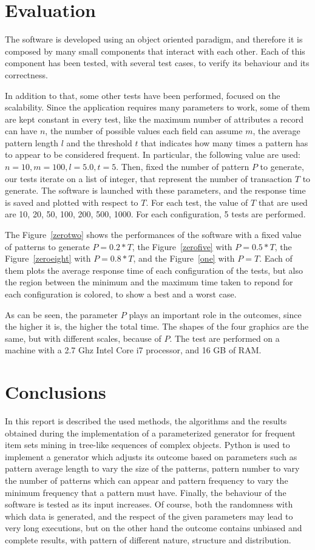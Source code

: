 \documentclass{acm_proc_article-sp-sigmod09}
\begin{document}
\section{Evaluation}
The software is developed using an object oriented paradigm, and therefore it is composed by many small components that interact with each other. Each of this component has been tested, with several test cases, to verify its behaviour and its correctness.

In addition to that, some other tests have been performed, focused on the scalability. Since the application requires many parameters to work, some of them are kept constant in every test, like the maximum number of attributes a record can have $n$, the number of possible values each field can assume $m$, the average pattern length $l$ and the threshold $t$ that indicates how many times a pattern has to appear to be considered frequent. In particular, the following value are used: $n = 10, m = 100, l = 5.0, t = 5$. Then, fixed the number of pattern $P$ to generate, our tests iterate on a list of integer, that represent the number of transaction $T$ to generate. The software is launched with these parameters, and the response time is saved and plotted with respect to $T$. For each test, the value of $T$ that are used are 10, 20, 50, 100, 200, 500, 1000. For each configuration, 5 tests are performed.

The Figure~\ref{zerotwo} shows the performances of the software with a fixed value of patterns to generate $P = 0.2 * T$, the Figure~\ref{zerofive} with $P = 0.5 * T$, the Figure~\ref{zeroeight} with $P = 0.8 * T$, and the Figure~\ref{one} with $P = T$. Each of them plots the average response time of each configuration of the tests, but also the region between the minimum and the maximum time taken to repond for each configuration is colored, to show a best and a worst case.

As can be seen, the parameter $P$ plays an important role in the outcomes, since the higher it is, the higher the total time. The shapes of the four graphics are the same, but with different scales, because of $P$. The test are performed on a machine with a 2.7 Ghz Intel Core i7 processor, and 16 GB of RAM.

\section{Conclusions}
In this report is described the used methods, the algorithms and the results obtained during the implementation of a parameterized generator for frequent item sets mining in tree-like sequences of complex objects. Python is used to implement a generator which adjusts its outcome based on parameters such as pattern average length to vary the size of the patterns, pattern number to vary the number of patterns which can appear and pattern frequency to vary the minimum frequency that a pattern must have. Finally, the behaviour of the software is tested as its input increases. Of course, both the randomness with which data is generated, and the respect of the given parameters may lead to very long executions, but on the other hand the outcome contains unbiased and complete results, with pattern of different nature, structure and distribution.
\end{document}
